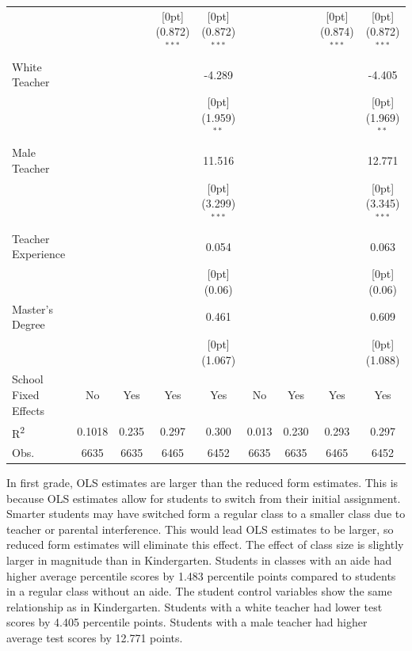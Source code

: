 \documentclass[a4paper,11pt]{article}
\begin{document}
\begin{table}[H]
\begin{tabular*}{\textwidth}{@{\extracolsep{\fill}}lcccccccc}
	&	&	&	\raisebox{.7ex}[0pt]{\scriptsize (0.872)$^{***}$} &	\raisebox{.7ex}[0pt]{\scriptsize (0.872)$^{***}$} 	&	&	&	\raisebox{.7ex}[0pt]{\scriptsize (0.874)$^{***}$} &	\raisebox{.7ex}[0pt]{\scriptsize (0.872)$^{***}$}\\
	White Teacher &	&	&	&	-4.289 &	&	&	&	-4.405\\
	&	&	&	&	\raisebox{.7ex}[0pt]{\scriptsize (1.959)$^{**}$} 	&	&	&	&	\raisebox{.7ex}[0pt]{\scriptsize (1.969)$^{**}$}\\
	Male Teacher &	&	&	&	11.516&	&	&	&	12.771  \\
	&	&	&	&	\raisebox{.7ex}[0pt]{\scriptsize (3.299)$^{***}$} 	&	&	&	&	\raisebox{.7ex}[0pt]{\scriptsize (3.345)$^{***}$}\\
	Teacher Experience &	&	&	&	0.054 &	&	&	&	0.063\\
	&	&	&	&	\raisebox{.7ex}[0pt]{\scriptsize (0.06)}&	&	&	&	\raisebox{.7ex}[0pt]{\scriptsize (0.06)} \\
	Master's Degree &	&	&	&	0.461&	&	&	&	0.609 \\
	&	&	&	&	\raisebox{.7ex}[0pt]{\scriptsize (1.067)} &	&	&	&	\raisebox{.7ex}[0pt]{\scriptsize (1.088)}\\
	School Fixed Effects &	No  & Yes &	Yes & Yes &	No & Yes &	Yes & Yes \\
	R\textsuperscript{2} & 0.1018 & 0.235 & 0.297 & 0.300 & 0.013 & 0.230 & 0.293 & 0.297 \\
	Obs. &	6635 &	6635 &	6465 &	6452  &	6635 &	6635 &	6465 &	6452\\
	\hline\hline				
\end{tabular*}
\end{table}
In first grade, OLS estimates are larger than the reduced form estimates. This is because OLS estimates allow for students to switch from their initial assignment. Smarter students may have switched form a regular class to a smaller class due to teacher or parental interference. This would lead OLS estimates to be larger, so reduced form estimates will eliminate this effect. The effect of class size is slightly larger in magnitude than in Kindergarten. Students in classes with an aide had higher average percentile scores by 1.483 percentile points compared to students in a regular class without an aide. The student control variables show the same relationship as in Kindergarten. Students with a white teacher had lower test scores by 4.405 percentile points. Students with a male teacher had higher average test scores by 12.771 points. \par
\end{document}
